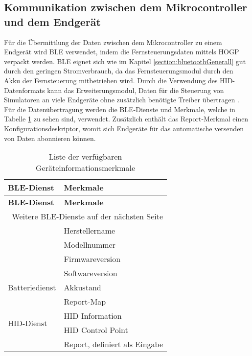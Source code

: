 \subsection{Kommunikation zwischen dem Mikrocontroller und dem Endgerät}
\label{section:communicationModuleDevice}
Für die Übermittlung der Daten zwischen dem Mikrocontroller zu einem Endgerät wird \ac{BLE} verwendet, indem die Fernsteuerungsdaten mittels \ac{HOGP} verpackt werden. \ac{BLE} eignet sich wie im Kapitel \ref{section:bluetoothGenerall} gut durch den geringen Stromverbrauch, da das Fernsteuerungsmodul durch den Akku der Fernsteuerung mitbetrieben wird. Durch die Verwendung des \ac{HID}-Datenformats kann das Erweiterungsmodul, Daten für die Steuerung von Simulatoren an viele Endgeräte ohne zusätzlich benötigte Treiber übertragen \cite{microsoftHID}. Für die Datenübertragung werden die \ac{BLE}-Dienste und Merkmale, welche in Tabelle \ref{table:usedServicesAndCharacteristics} zu sehen sind, verwendet. Zusätzlich enthält das Report-Merkmal einen Konfigurationsdeskriptor, womit sich Endgeräte für das automatische versenden von Daten abonnieren können.

\begin{longtable}[c]{|l|l|}
    \caption{Liste der verfügbaren Geräteinformationsmerkmale}
    \label{table:usedServicesAndCharacteristics}\\
    \hline
    \textbf{\ac{BLE}-Dienst} & \textbf{Merkmale}\\
    \hline
    \hline
    \endfirsthead

    \hline
    \textbf{\ac{BLE}-Dienst} & \textbf{Merkmale}\\
    \hline
    \hline
    \endhead

    \hline
    \multicolumn{2}{|r|}{Weitere \ac{BLE}-Dienste auf der nächsten Seite}\\
    \hline
    \endfoot

    \hline
    \endlastfoot
    
    \multirow{4}{*}{Geräteinformationsdienst} & Herstellername\\
    \cline{2-2}
     & Modellnummer\\
     \cline{2-2}
     & Firmwareversion\\
     \cline{2-2}
     & Softwareversion\\
    \hline
    \multirow{1}{*}{Batteriedienst} & Akkustand\\
    \hline
    \multirow{4}{*}{\ac{HID}-Dienst} & Report-Map\\
    \cline{2-2}
     & \ac{HID} Information\\
     \cline{2-2}
     & \ac{HID} Control Point\\
     \cline{2-2}
     & Report, definiert als Eingabe\\
\end{longtable}

